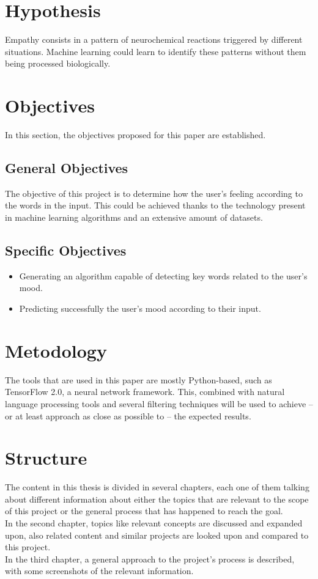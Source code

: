 \section{Hypothesis}
Empathy consists in a pattern of neurochemical reactions triggered by different situations. Machine learning could learn to identify these patterns without them being processed biologically.

\section{Objectives}
In this section, the objectives proposed for this paper are established.

\subsection{General Objectives}
The objective of this project is to determine how the user's feeling according to the words in the input. This could be achieved thanks to the technology present in machine learning algorithms and an extensive amount of datasets.

\subsection{Specific Objectives}
\begin{itemize}
	\item Generating an algorithm capable of detecting key words related to the user's mood.
	\item Predicting successfully the user's mood according to their input.
\end{itemize}

\section{Metodology}
The tools that are used in this paper are mostly Python-based, such as TensorFlow 2.0, a neural network framework. This, combined with natural language processing tools and several filtering techniques will be used to achieve -- or at least approach as close as possible to -- the expected results.

\section{Structure}
The content in this thesis is divided in several chapters, each one of them talking about different information about either the topics that are relevant to the scope of this project or the general process that has happened to reach the goal.\\
In the second chapter, topics like relevant concepts are discussed and expanded upon, also related content and similar projects are looked upon and compared to this project.\\
In the third chapter, a general approach to the project's process is described, with some screenshots of the relevant information.
\clearpage